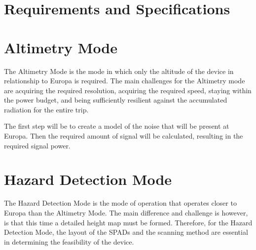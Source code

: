 \documentclass[]{report}
\begin{document}
\chapter{Requirements and Specifications}\label{sec:requirements_and_specifications}

%






\chapter{Altimetry Mode}\label{sec:altimetry_mode}
The Altimetry Mode is the mode in which only the altitude of the device in relationship to Europa is required. The main challenges for the Altimetry mode are acquiring the required resolution, acquiring the required speed, staying within the power budget, and being sufficiently resilient against the accumulated radiation for the entire trip.

The first step will be to create a model of the noise that will be present at Europa. Then the required amount of signal will be calculated, resulting in the required signal power. 



% 



%

\chapter{Hazard Detection Mode}\label{sec:hazard_detection_mode}
The Hazard Detection Mode is the mode of operation that operates closer to Europa than the Altimetry Mode. The main difference and challenge is however, is that this time a detailed height map must be formed. Therefore, for the Hazard Detection Mode, the layout of the SPADs and the scanning method are essential in determining the feasibility of the device. 






\clearpage

\end{document}
